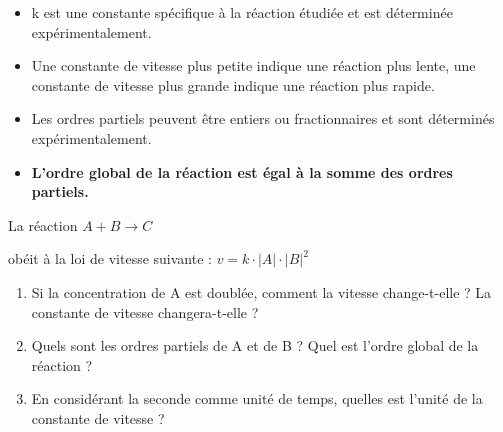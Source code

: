 \documentclass[
  11pt,
  a4paper,
  openany]{book}
\providecommand{\tightlist}{%
  \setlength{\itemsep}{0pt}\setlength{\parskip}{0pt}}
\begin{document}
\begin{itemize}
\tightlist
\item
  k est une constante spécifique à la réaction étudiée et est déterminée expérimentalement.
\item
  Une constante de vitesse plus petite indique une réaction plus lente, une constante de vitesse plus grande indique une réaction plus rapide.
\item
  Les ordres partiels peuvent être entiers ou fractionnaires et sont déterminés expérimentalement.
\item
  \textbf{L'ordre global de la réaction est égal à la somme des ordres partiels.}
\end{itemize}

\begin{Exercise}

La réaction \(A + B \rightarrow C\)

obéit à la loi de vitesse suivante : \(v = k \cdot |A| \cdot |B|^2\)

\begin{enumerate}
\def\labelenumi{\arabic{enumi}.}
\tightlist
\item
  Si la concentration de A est doublée, comment la vitesse change-t-elle ? La constante de vitesse changera-t-elle ?
\item
  Quels sont les ordres partiels de A et de B ? Quel est l'ordre global de la réaction ?
\item
  En considérant la seconde comme unité de temps, quelles est l'unité de la constante de vitesse ?
\end{enumerate}

\end{Exercise}
\end{document}
